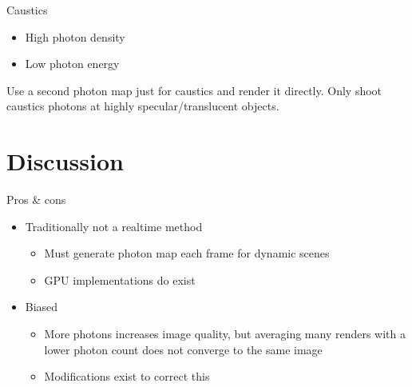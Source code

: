 \documentclass{beamer}
\begin{document}
      \begin{frame}{Caustics}
        \begin{itemize}
          \item<2-> High photon density
          \item<3-> Low photon energy
        \end{itemize}

         Use a second photon map just for caustics and render it directly.
         Only shoot caustics photons at highly specular/translucent objects.
      \end{frame}

  \section{Discussion}
    \begin{frame}{Pros \& cons}
        \begin{itemize}
          \item<2-> Traditionally not a realtime method
            \begin{itemize}
              \item<3-> Must generate photon map each frame for dynamic scenes
              \item<4-> GPU implementations do exist
            \end{itemize}
          \item<5-> Biased
            \begin{itemize}
              \item<6-> More photons increases image quality, but averaging many renders with a lower photon count does not converge to the same image
              \item<7-> Modifications exist to correct this
            \end{itemize}
        \end{itemize}
    \end{frame}
\end{document}
